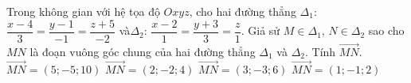 \begin{ex}%
	Trong không gian với hệ tọa độ $Oxyz$, cho hai đường thẳng $\Delta_1$: $\dfrac{x-4}{3}=\dfrac{y-1}{-1}=\dfrac{z+5}{-2}$ và\break $\Delta_2$: $\dfrac{x-2}{1}=\dfrac{y+3}{3}=\dfrac{z}{1}$. Giả sử $M\in \Delta_1$, $N\in \Delta_2$ sao cho $MN$ là đoạn vuông góc chung của hai đường thẳng $\Delta_1$ và $\Delta_2$. Tính $\overrightarrow{MN}$.
	\choice
	{$\overrightarrow{MN}=\left(5;-5;10\right)$}
	{\True $\overrightarrow{MN}=\left(2;-2;4\right)$}
	{$\overrightarrow{MN}=\left(3;-3;6\right)$}
	{$\overrightarrow{MN}=\left(1;-1;2\right)$}
\end{ex}
